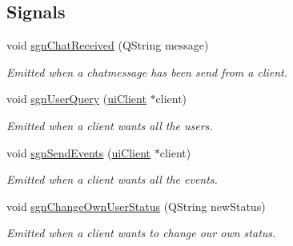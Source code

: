 \subsection*{Signals}
\begin{DoxyCompactItemize}
\item 
void \hyperlink{classserver_1_1ui_server_af8accf173f4aa7dc5f59c56016645726}{sgn\-Chat\-Received} (Q\-String message)
\begin{DoxyCompactList}\small\item\em Emitted when a chatmessage has been send from a client. \end{DoxyCompactList}\item 
void \hyperlink{classserver_1_1ui_server_a8ac8c9444c217209d1e30983d60cad97}{sgn\-User\-Query} (\hyperlink{classserver_1_1ui_client}{ui\-Client} $\ast$client)
\begin{DoxyCompactList}\small\item\em Emitted when a client wants all the users. \end{DoxyCompactList}\item 
void \hyperlink{classserver_1_1ui_server_a1097da2f20a545c302e9f4cab29a4a87}{sgn\-Send\-Events} (\hyperlink{classserver_1_1ui_client}{ui\-Client} $\ast$client)
\begin{DoxyCompactList}\small\item\em Emitted when a client wants all the events. \end{DoxyCompactList}\item 
void \hyperlink{classserver_1_1ui_server_afcd9f0421bb52f2b83be4fa924958211}{sgn\-Change\-Own\-User\-Status} (Q\-String new\-Status)
\begin{DoxyCompactList}\small\item\em Emitted when a client wants to change our own status. \end{DoxyCompactList}\end{DoxyCompactItemize}
